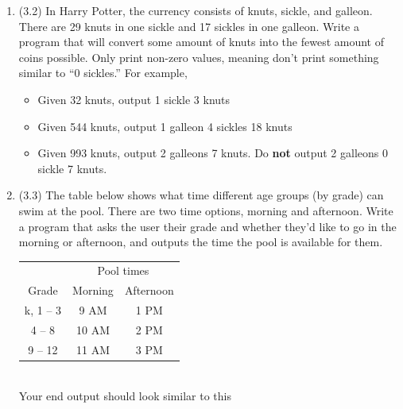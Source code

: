 \documentclass{article}
\begin{document}
\begin{enumerate}

\item (3.2)  
		In Harry Potter, the currency consists of knuts, sickle, and galleon.  There are 29 knuts in 
		one sickle and 17 sickles in one galleon.  Write a program that will convert some amount of 
		knuts into the fewest amount of coins possible.  Only print non-zero values, meaning don't 
		print something similar to ``0 sickles.''  For example,
		\begin{itemize}
			\item Given 32 knuts, output 1 sickle 3 knuts
			\item Given 544 knuts, output 1 galleon 4 sickles 18 knuts
			\item Given 993 knuts, output 2 galleons 7 knuts. 
				Do \textbf{not} output 2 galleons 0 sickle 7 knuts.
		\end{itemize}




\item (3.3)  
		The table below shows what time different age groups (by grade) can swim at the pool.  There 
		are two time options, morning and afternoon.  Write a program that asks the user their grade 
		and whether they'd like to go in the morning or afternoon, and outputs the time the pool is 
		available for them.

		\begin{minipage}{.45\textwidth}
		\begin{tabular}{c|cc}
						& \multicolumn{2}{c}{Pool times}\\
			Grade 		& Morning 	& Afternoon \\ \hline
			k, 1 -- 3 	& 9 AM 		& 1 PM\\
			4 -- 8 		& 10 AM 	& 2 PM\\
			9 -- 12 	& 11 AM 	& 3 PM \\
		\end{tabular}
		\end{minipage}
		\begin{minipage}{.45\textwidth}
			\ \\
			Your end output should look similar to this

		\end{minipage}




\end{enumerate}
\end{document}
